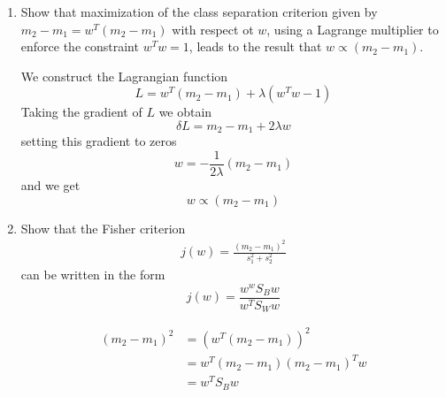 \documentclass[a4paper]{article}
\begin{document}
	\courseheader
	\begin{enumerate}
		\setlength{\itemsep}{3\parskip}
		\item
		Show that maximization of the class separation criterion given by $m_2 - m_1 = w^T(m_2- m_1) $ with respect ot $w$, using a Lagrange multiplier to enforce the constraint $w^Tw = 1$, leads to the result that $w \propto (m_2 - m_1)$.
		\begin{solution}
			We construct the Lagrangian function
			\begin{equation*}
				L=w^T(m_2-m_1)+\lambda(w^Tw-1)
			\end{equation*}
			Taking the gradient of $L$ we obtain
			\begin{equation*}
				\delta L=m_2-m_1+2\lambda w
			\end{equation*}
			setting this gradient to zeros
			\begin{equation*}
				w=-\frac{1}{2\lambda}(m_2-m_1)
			\end{equation*}
			and we get
			\begin{equation*}
				w \propto (m_2-m_1)
			\end{equation*}
		\end{solution}
		\item
		Show that the Fisher criterion
		\begin{equation*}
			\begin{aligned}
				j(w) = \frac{(m_2 - m_1)^2}{s_1^2 + s_2^2}
			\end{aligned}
		\end{equation*}
		can be written in the form
		\begin{equation*}
			j(w) = \frac{w^wS_Bw}{w^TS_Ww}
		\end{equation*}
		\begin{solution}
			\begin{equation*}
				\begin{aligned}
				(m_2-m_1)^2 &=(w^T(m_2-m_1))^2\\
				&=w^T(m_2-m_1)(m_2-m_1)^Tw\\
				&=w^TS_Bw
				\end{aligned}
			\end{equation*}
		\end{solution}
		

\end{enumerate}
\end{document}
